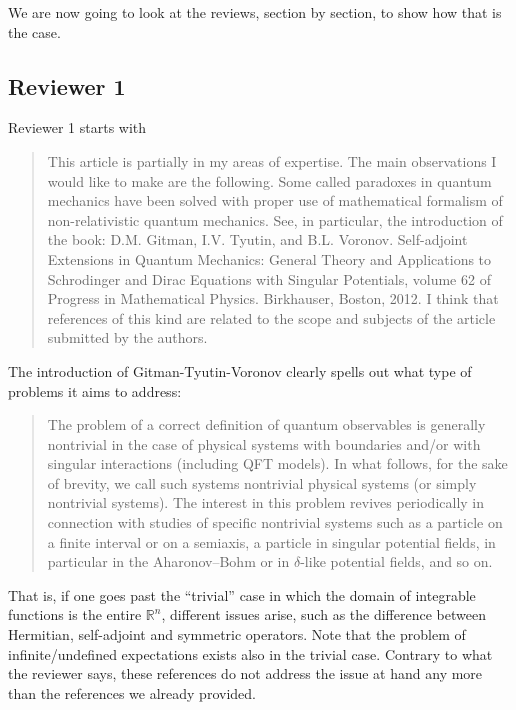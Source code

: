 \documentclass[11pt, executivepaper]{article}
\begin{document}
We are now going to look at the reviews, section by section, to show how that is the case.

\subsection*{Reviewer 1}

Reviewer 1 starts with
\begin{quote}
This article is partially in my areas of expertise. The main observations I
would like to make are the following.
Some called paradoxes in quantum mechanics have been solved with proper
use of mathematical formalism of non-relativistic quantum mechanics. See,
in particular, the introduction of the book: D.M. Gitman, I.V. Tyutin, and
B.L. Voronov. Self-adjoint Extensions in Quantum Mechanics: General Theory
and Applications to Schrodinger and Dirac Equations with Singular Potentials,
volume 62 of Progress in Mathematical Physics. Birkhauser, Boston, 2012. I
think that references of this kind are related to the scope and subjects of the
article submitted by the authors.
\end{quote}

The introduction of Gitman-Tyutin-Voronov clearly spells out what type of problems it aims to address:
\begin{quote}
The problem of a correct definition of quantum observables is generally nontrivial in the case of physical systems with boundaries and/or with singular interactions (including QFT models). In what
follows, for the sake of brevity, we call such systems nontrivial physical systems (or simply nontrivial systems). The interest in this problem revives periodically in connection with studies of specific nontrivial systems such as a particle on a
finite interval or on a semiaxis, a particle in singular potential fields, in particular in the Aharonov–Bohm or in $\delta$-like potential fields, and so on.
\end{quote}
That is, if one goes past the ``trivial'' case in which the domain of integrable functions is the entire $\mathbb{R}^n$, different issues arise, such as the difference between Hermitian, self-adjoint and symmetric operators. Note that the problem of infinite/undefined expectations exists also in the trivial case. Contrary to what the reviewer says, these references do not address the issue at hand any more than the references we already provided.
\end{document}
